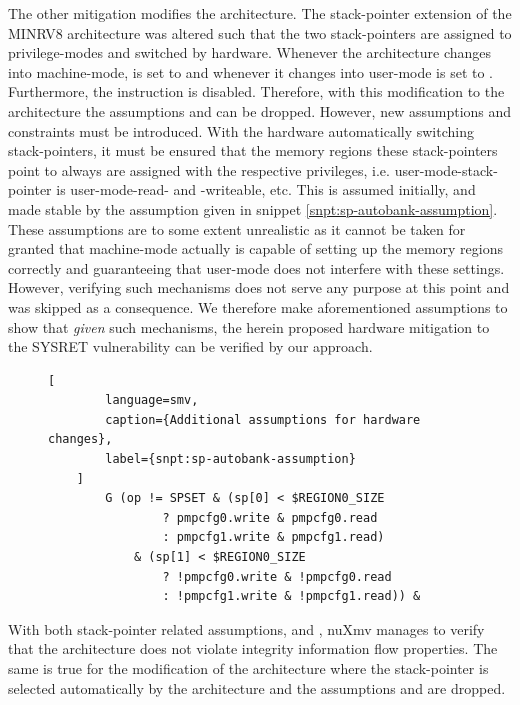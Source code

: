 The other mitigation modifies the architecture.
The stack-pointer extension of the MINRV8 architecture was altered such that the two stack-pointers are assigned to privilege-modes and switched by hardware.
Whenever the architecture changes into machine-mode,  is set to  and whenever it changes into user-mode  is set to .
Furthermore, the  instruction is disabled.
Therefore, with this modification to the architecture the assumptions  and  can be dropped.
However, new assumptions and  constraints must be introduced.
With the hardware automatically switching stack-pointers, it must be ensured that the memory regions these stack-pointers point to always are assigned with the respective privileges, i.e. user-mode-stack-pointer is user-mode-read- and -writeable, etc.
This is assumed initially, and made stable by the assumption given in snippet \ref{snpt:sp-autobank-assumption}.
These assumptions are to some extent unrealistic as it cannot be taken for granted that machine-mode actually is capable of setting up the memory regions correctly and guaranteeing that user-mode does not interfere with these settings.
However, verifying such mechanisms does not serve any purpose at this point and was skipped as a consequence.
We therefore make aforementioned assumptions to show that \textit{given} such mechanisms, the herein proposed hardware mitigation to the SYSRET vulnerability can be verified by our approach.

\begin{figure}
    \begin{lstlisting}[
        language=smv,
        caption={Additional assumptions for hardware changes},
        label={snpt:sp-autobank-assumption}
    ]
        G (op != SPSET & (sp[0] < $REGION0_SIZE
                ? pmpcfg0.write & pmpcfg0.read
                : pmpcfg1.write & pmpcfg1.read)
            & (sp[1] < $REGION0_SIZE
                ? !pmpcfg0.write & !pmpcfg0.read
                : !pmpcfg1.write & !pmpcfg1.read)) &
    \end{lstlisting}
\end{figure}

With both stack-pointer related assumptions,  and , nuXmv manages to verify that the architecture does not violate integrity information flow properties.
The same is true for the modification of the architecture where the stack-pointer is selected automatically by the architecture and the assumptions  and  are dropped.

